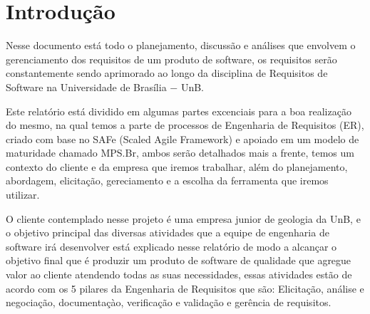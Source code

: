 \chapter{Introdução}

  Nesse documento está todo o planejamento, discussão e análises que envolvem o gerenciamento dos requisitos de um produto de
  software, os requisitos serão constantemente sendo aprimorado ao longo da disciplina de Requisitos de Software na Universidade
  de Brasília $-$ UnB.

  Este relatório está dividido em algumas partes excenciais para a boa realização do mesmo, na qual temos a parte de processos de
  Engenharia de Requisitos (ER), criado com base no SAFe (Scaled Agile Framework) e apoiado em um modelo de maturidade chamado MPS.Br,
  ambos serão detalhados mais a frente, temos um contexto do cliente e da empresa que iremos trabalhar, além do planejamento, abordagem,
  elicitação, gereciamento e a escolha da ferramenta que iremos utilizar.

  O cliente contemplado nesse projeto é uma empresa junior de geologia da UnB, e o objetivo principal das diversas atividades que a
  equipe de engenharia de software irá desenvolver está explicado nesse relatório de modo a alcançar o objetivo final que é produzir
  um produto de software de qualidade que agregue valor ao cliente atendendo todas as suas necessidades, essas atividades estão de
  acordo com os 5 pilares da Engenharia de Requisitos que são: Elicitação, análise e negociação, documentaçào, verificação e validação
  e gerência de requisitos.
